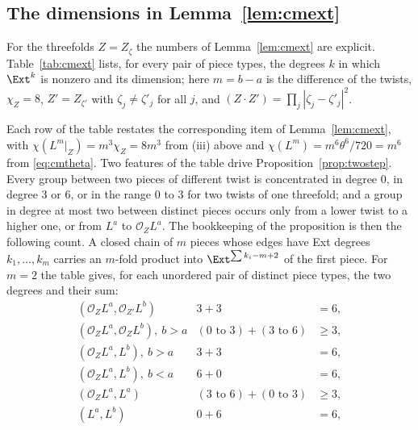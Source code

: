 \subsection{The dimensions in Lemma~\ref{lem:cmext}}\label{app:extdims}

For the threefolds $Z=Z_{\zeta}$ the numbers of Lemma~\ref{lem:cmext} are explicit. Table~\ref{tab:cmext} lists, for every pair of piece types, the degrees $k$ in which $\Ext^{k}$ is nonzero and its dimension; here $m=b-a$ is the difference of the twists, $\chi_{Z}=8$, $Z'=Z_{\zeta'}$ with $\zeta_{j}\ne\zeta'_{j}$ for all $j$, and $(Z\cdot Z')=\prod_{j}|\zeta_{j}-\zeta'_{j}|^{2}$.



Each row of the table restates the corresponding item of Lemma~\ref{lem:cmext}, with $\chi(L^{m}|_{Z})=m^{3}\chi_{Z}=8m^{3}$ from (iii) above and $\chi(L^{m})=m^{6}\theta^{6}/720=m^{6}$ from \eqref{eq:cmtheta}. Two features of the table drive Proposition~\ref{prop:twostep}. Every group between two pieces of different twist is concentrated in degree $0$, in degree $3$ or $6$, or in the range $0$ to $3$ for two twists of one threefold; and a group in degree at most two between distinct pieces occurs only from a lower twist to a higher one, or from $L^{a}$ to $\mathcal{O}_{Z}L^{a}$. The bookkeeping of the proposition is then the following count. A closed chain of $m$ pieces whose edges have Ext degrees $k_{1},\dots,k_{m}$ carries an $m$-fold product into $\Ext^{\sum k_{i}-m+2}$ of the first piece. For $m=2$ the table gives, for each unordered pair of distinct piece types, the two degrees and their sum:
\begin{equation}\label{eq:cmtwostep}
\begin{array}{lll}
(\mathcal{O}_{Z}L^{a},\mathcal{O}_{Z'}L^{b}) & 3+3 & =6,\\
(\mathcal{O}_{Z}L^{a},\mathcal{O}_{Z}L^{b}),\ b>a & (0\text{ to }3)+(3\text{ to }6) & \ge3,\\
(\mathcal{O}_{Z}L^{a},L^{b}),\ b>a & 3+3 & =6,\\
(\mathcal{O}_{Z}L^{a},L^{b}),\ b<a & 6+0 & =6,\\
(\mathcal{O}_{Z}L^{a},L^{a}) & (3\text{ to }6)+(0\text{ to }3) & \ge3,\\
(L^{a},L^{b}) & 0+6 & =6,
\end{array}
\end{equation}
